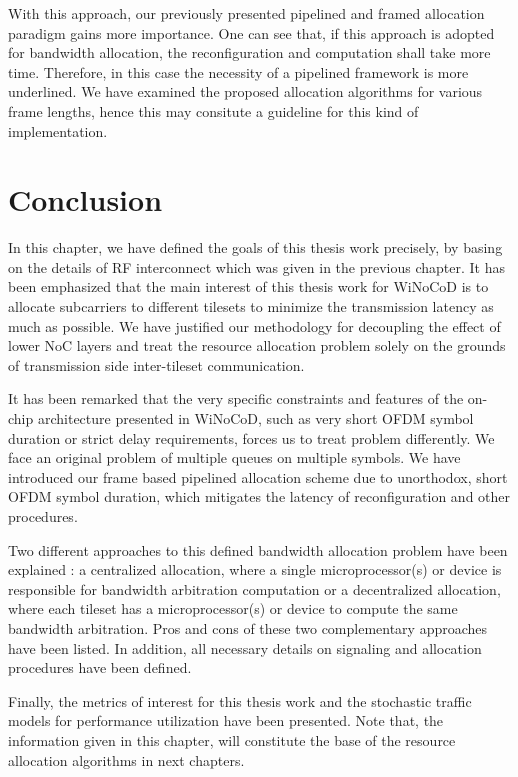 With this approach, our previously presented pipelined and framed allocation paradigm gains more importance. One can see that, if this approach is adopted for bandwidth allocation, the reconfiguration and computation shall take more time. Therefore, in this case the necessity of a pipelined framework is more underlined. We have examined the proposed allocation algorithms for various frame lengths, hence this may consitute a guideline for this kind of implementation.
\section{Conclusion}

In this chapter, we have defined the goals of this thesis work precisely, by basing on the details of RF interconnect which was given in the previous chapter. It has been emphasized that the main interest of this thesis work for WiNoCoD is to allocate subcarriers to different tilesets to minimize the transmission latency as much as possible. We have justified our methodology for decoupling the effect of lower NoC layers and treat the resource allocation problem solely on the grounds of transmission side inter-tileset communication.

It has been remarked that the very specific constraints and features of the on-chip architecture presented in WiNoCoD, such as very short OFDM symbol duration or strict delay requirements, forces us to treat problem differently. We face an original problem of multiple queues on multiple symbols. We have introduced our frame based pipelined allocation scheme due to unorthodox, short OFDM symbol duration, which mitigates the latency of reconfiguration and other procedures.    

Two different approaches to this defined bandwidth allocation problem have been explained : a centralized allocation, where a single microprocessor(s) or device is responsible for bandwidth arbitration computation or a decentralized allocation, where each tileset has a microprocessor(s) or device to compute the same bandwidth arbitration. Pros and cons of these two complementary approaches have been listed. In addition, all necessary details on signaling and allocation procedures have been defined. 

Finally, the metrics of interest for this thesis work and the stochastic traffic models for performance utilization have been presented. Note that, the information given in this chapter, will constitute the base of the resource allocation algorithms in next chapters. 
